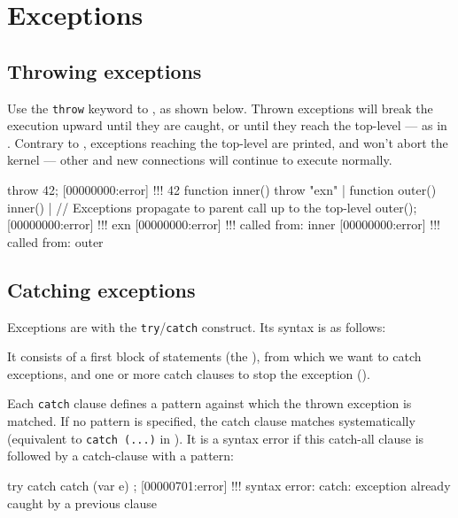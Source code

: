 \section{Exceptions}
\label{sec:lang:except}
\subsection{Throwing exceptions}
\label{sec:lang:throw}

Use the \lstinline|throw| keyword to , as shown below. Thrown exceptions will break the execution
upward until they are caught, or until they reach the top-level --- as in
\Cxx.  Contrary to \Cxx, exceptions reaching the top-level are printed, and
won't abort the kernel --- other and new connections will continue to
execute normally.

\begin{urbiscript}
throw 42;
[00000000:error] !!! 42
function inner() { throw "exn" } |
function outer() { inner() }|
// Exceptions propagate to parent call up to the top-level
outer();
[00000000:error] !!! exn
[00000000:error] !!!    called from: inner
[00000000:error] !!!    called from: outer
\end{urbiscript}

\subsection{Catching exceptions}
\label{sec:lang:catch}

Exceptions are  with the
\lstinline|try|/\lstinline|catch| construct. Its syntax is as follows:


It consists of a first block of statements (the ), from which
we want to catch exceptions, and one or more catch clauses to stop the
exception ().

Each \lstinline|catch| clause defines a pattern against which the thrown
exception is matched. If no pattern is specified, the catch clause matches
systematically (equivalent to \lstinline|catch (...)| in \Cxx).  It is a
syntax error if this catch-all clause is followed by a catch-clause with a
pattern:

\begin{urbiscript}
try {} catch {} catch (var e) {};
[00000701:error] !!! syntax error: catch: exception already caught by a previous clause
\end{urbiscript}

